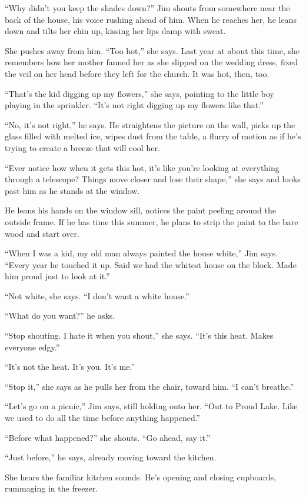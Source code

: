 \documentclass[
]{article}
\begin{document}
``Why didn't you keep the shades down?'' Jim shouts from somewhere near
the back of the house, his voice rushing ahead of him. When he reaches
her, he leans down and tilts her chin up, kiss­ing her lips damp with
sweat.

She pushes away from him. ``Too hot,'' she says. Last year at about this
time, she remembers how her mother fanned her as she slipped on the
wedding dress, fixed the veil on her head before they left for the
church. It was hot, then, too.

``That's the kid digging up my flowers,'' she says, pointing to the
little boy playing in the sprin­kler. ``It's not right digging up my
flowers like that.''

``No, it's not right,'' he says. He straightens the picture on the wall,
picks up the glass filled with melted ice, wipes dust from the table, a
flurry of motion as if he's trying to create a breeze that will cool
her.

``Ever notice how when it gets this hot, it's like you're looking at
everything through a telescope? Things move closer and lose their
shape,'' she says and looks past him as he stands at the window.

He leans his hands on the window sill, notices the paint peeling around
the outside frame. If he has time this summer, he plans to strip the
paint to the bare wood and start over.

``When I was a kid, my old man always painted the house white,'' Jim
says. ``Every year he touched it up. Said we had the whitest house on
the block. Made him proud just to look at it.''

``Not white, she says. ``I don't want a white house.''

``What do you want?'' he asks.

``Stop shouting. I hate it when you shout,'' she says. ``It's this heat.
Makes everyone edgy.''

``It's not the heat. It's you. It's me.''

``Stop it,'' she says as he pulls her from the chair, toward him. ``I
can't breathe.''

``Let's go on a picnic,'' Jim says, still holding onto her. ``Out to
Proud Lake. Like we used to do all the time before anything happened.''

``Before what happened?'' she shouts. ``Go ahead, say it.''

``Just before,'' he says, already moving toward the kitchen.

She hears the familiar kitchen sounds. He's opening and closing
cupboards, rummaging in the freezer.
\end{document}
